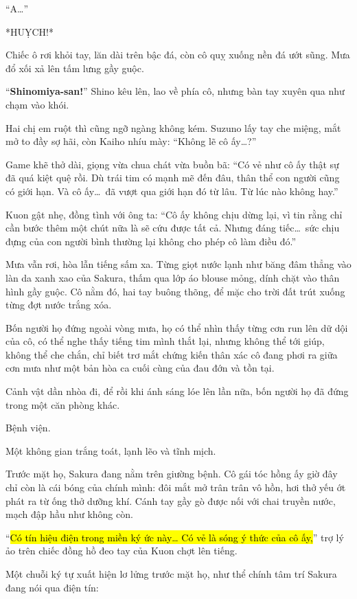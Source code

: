 \documentclass[../main.tex]{subfiles}
\begin{document}
``A\dots''

*HUỴCH!*

Chiếc ô rơi khỏi tay, lăn dài trên bậc đá, còn cô quỵ xuống nền đá ướt sũng. Mưa đổ xối xả lên tấm lưng gầy guộc.

``\textbf{Shinomiya-san!}'' Shino kêu lên, lao về phía cô, nhưng bàn tay xuyên qua như chạm vào khói.

Hai chị em ruột thì cũng ngỡ ngàng không kém. Suzuno lấy tay che miệng, mắt mở to đầy sợ hãi, còn Kaiho nhíu mày: ``Không lẽ cô ấy\dots?''

Game khẽ thở dài, giọng vừa chua chát vừa buồn bã: ``Có vẻ như cô ấy thật sự đã quá kiệt quệ rồi. Dù trái tim có mạnh mẽ đến đâu, thân thể con người cũng có giới hạn. Và cô ấy\dots\ đã vượt qua giới hạn đó từ lâu. Từ lúc nào không hay.''

Kuon gật nhẹ, đồng tình với ông ta: ``Cô ấy không chịu dừng lại, vì tin rằng chỉ cần bước thêm một chút nữa là sẽ cứu được tất cả. Nhưng đáng tiếc\dots\ sức chịu đựng của con người bình thường lại không cho phép cô làm điều đó.''

Mưa vẫn rơi, hòa lẫn tiếng sấm xa. Từng giọt nước lạnh như băng đâm thẳng vào làn da xanh xao của Sakura, thấm qua lớp áo blouse mỏng, dính chặt vào thân hình gầy guộc. Cô nằm đó, hai tay buông thõng, để mặc cho trời đất trút xuống từng đợt nước trắng xóa.

Bốn người họ đứng ngoài vòng mưa, họ có thể nhìn thấy từng cơn run lên dữ dội của cô, có thể nghe thấy tiếng tim mình thắt lại, nhưng không thể tới giúp, không thể che chắn, chỉ biết trơ mắt chứng kiến thân xác cô đang phơi ra giữa cơn mưa như một bản hòa ca cuối cùng của đau đớn và tồn tại.

Cảnh vật dần nhòa đi, để rồi khi ánh sáng lóe lên lần nữa, bốn người họ đã đứng trong một căn phòng khác.

Bệnh viện.

Một không gian trắng toát, lạnh lẽo và tĩnh mịch.


Trước mặt họ, Sakura đang nằm trên giường bệnh. Cô gái tóc hồng ấy giờ đây chỉ còn là cái bóng của chính mình: đôi mắt mở trân trân vô hồn, hơi thở yếu ớt phát ra từ ống thở dưỡng khí. Cánh tay gầy gò được nối với chai truyền nước, mạch đập hầu như không còn.

``\hl{Có tín hiệu điện trong miền ký ức này\dots{} Có vẻ là sóng ý thức của cô ấy,}'' trợ lý ảo trên chiếc đồng hồ đeo tay của Kuon chợt lên tiếng.

Một chuỗi ký tự xuất hiện lơ lửng trước mặt họ, như thể chính tâm trí Sakura đang nói qua điện tín:
\end{document}
